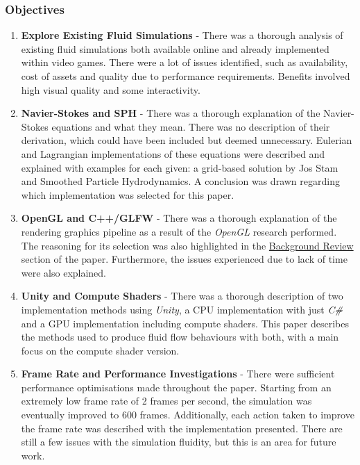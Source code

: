 \documentclass[12pt]{article}
\begin{document}
    \subsubsection{Objectives}

    \begin{enumerate}
        \item \textbf{Explore Existing Fluid Simulations} - There was a thorough analysis of existing fluid simulations both available online and already implemented within video games. There were a lot of issues identified, such as availability, cost of assets and quality due to performance requirements. Benefits involved high visual quality and some interactivity.
        \item \textbf{Navier-Stokes and SPH} - There was a thorough explanation of the Navier-Stokes equations and what they mean. There was no description of their derivation, which could have been included but deemed unnecessary. Eulerian and Lagrangian implementations of these equations were described and explained with examples for each given: a grid-based solution by Jos Stam and Smoothed Particle Hydrodynamics. A conclusion was drawn regarding which implementation was selected for this paper.
        \item \textbf{OpenGL and C++/GLFW} - There was a thorough explanation of the rendering graphics pipeline as a result of the \textit{OpenGL} research performed. The reasoning for its selection was also highlighted in the \hyperref[sec:backgroundreview]{Background Review} section of the paper. Furthermore, the issues experienced due to lack of time were also explained.
        \item \textbf{Unity and Compute Shaders} - There was a thorough description of two implementation methods using \textit{Unity}, a CPU implementation with just \textit{C\#} and a GPU implementation including compute shaders. This paper describes the methods used to produce fluid flow behaviours with both, with a main focus on the compute shader version.
        \item \textbf{Frame Rate and Performance Investigations} - There were sufficient performance optimisations made throughout the paper. Starting from an extremely low frame rate of 2 frames per second, the simulation was eventually improved to 600 frames. Additionally, each action taken to improve the frame rate was described with the implementation presented. There are still a few issues with the simulation fluidity, but this is an area for future work.
    \end{enumerate}
\end{document}
